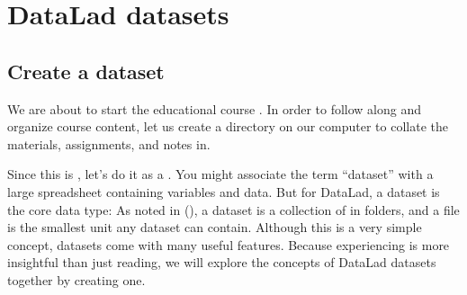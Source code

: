 \chapter{DataLad datasets}
\label{\detokenize{basics/basics-datasets:datalad-datasets}}\label{\detokenize{basics/basics-datasets:chapter-datasets}}\label{\detokenize{basics/basics-datasets::doc}}

\sphinxstepscope

\ignorespaces 

\section{Create a dataset}
\label{\detokenize{basics/101-101-create:create-a-dataset}}\label{\detokenize{basics/101-101-create:createds}}\label{\detokenize{basics/101-101-create:index-0}}\label{\detokenize{basics/101-101-create::doc}}
\sphinxAtStartPar
We are about to start the educational course .
In order to follow along and organize course content, let us create
a directory on our computer to collate the materials, assignments, and
notes in.

\sphinxAtStartPar
Since this is , let’s do it as a {\hyperref[\detokenize{glossary:term-DataLad-dataset}]{}}.
You might associate the term “dataset” with a large spreadsheet containing
variables and data.
But for DataLad, a dataset is the core data type:
As noted in {\hyperref[\detokenize{intro/philosophy:philo}]{}} (), a dataset is a collection of 
in folders, and a file is the smallest unit any dataset can contain.
Although this is a very simple concept, datasets come with many
useful features.
Because experiencing is more insightful than just reading, we will explore the
concepts of DataLad datasets together by creating one.

